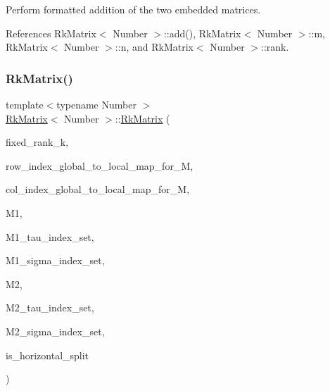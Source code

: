 Perform formatted addition of the two embedded matrices.

References Rk\+Matrix$<$ Number $>$\+::add(), Rk\+Matrix$<$ Number $>$\+::m, Rk\+Matrix$<$ Number $>$\+::n, and Rk\+Matrix$<$ Number $>$\+::rank.

\mbox{\label{classRkMatrix_a0ef50f2d8d07bcbffa0a6d015dc0d1a4}} 
\subsubsection{\texorpdfstring{Rk\+Matrix()}{RkMatrix()}\hspace{0.1cm}{\footnotesize\ttfamily [15/18]}}
{\footnotesize\ttfamily template$<$typename Number $>$ \\
\hyperlink{classRkMatrix}{Rk\+Matrix}$<$ Number $>$\+::\hyperlink{classRkMatrix}{Rk\+Matrix} (\begin{DoxyParamCaption}\item[{const \hyperlink{classRkMatrix_add060bfc3a4cc77f858c3d6dd58cadd5}{size\+\_\+type}}]{fixed\+\_\+rank\+\_\+k,  }\item[{const std\+::map$<$ types\+::global\+\_\+dof\+\_\+index, size\+\_\+t $>$ \&}]{row\+\_\+index\+\_\+global\+\_\+to\+\_\+local\+\_\+map\+\_\+for\+\_\+M,  }\item[{const std\+::map$<$ types\+::global\+\_\+dof\+\_\+index, size\+\_\+t $>$ \&}]{col\+\_\+index\+\_\+global\+\_\+to\+\_\+local\+\_\+map\+\_\+for\+\_\+M,  }\item[{const \hyperlink{classRkMatrix}{Rk\+Matrix}$<$ Number $>$ \&}]{M1,  }\item[{const std\+::vector$<$ types\+::global\+\_\+dof\+\_\+index $>$ \&}]{M1\+\_\+tau\+\_\+index\+\_\+set,  }\item[{const std\+::vector$<$ types\+::global\+\_\+dof\+\_\+index $>$ \&}]{M1\+\_\+sigma\+\_\+index\+\_\+set,  }\item[{const \hyperlink{classRkMatrix}{Rk\+Matrix}$<$ Number $>$ \&}]{M2,  }\item[{const std\+::vector$<$ types\+::global\+\_\+dof\+\_\+index $>$ \&}]{M2\+\_\+tau\+\_\+index\+\_\+set,  }\item[{const std\+::vector$<$ types\+::global\+\_\+dof\+\_\+index $>$ \&}]{M2\+\_\+sigma\+\_\+index\+\_\+set,  }\item[{bool}]{is\+\_\+horizontal\+\_\+split }\end{DoxyParamCaption})}

